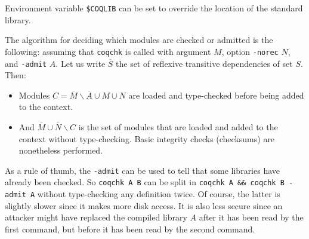 Environment variable \verb:$COQLIB: can be set to override the
location of the standard library.

The algorithm for deciding which modules are checked or admitted is
the following: assuming that {\tt coqchk} is called with argument $M$,
option {\tt -norec} $N$, and {\tt -admit} $A$. Let us write
$\overline{S}$ the set of reflexive transitive dependencies of set
$S$. Then:
\begin{itemize}
\item Modules $C=\overline{M}\backslash\overline{A}\cup M\cup N$ are
  loaded and type-checked before being added to the context.
\item And $\overline{M}\cup\overline{N}\backslash C$ is the set of
  modules that are loaded and added to the context without
  type-checking. Basic integrity checks (checksums) are nonetheless
  performed.
\end{itemize}

As a rule of thumb, the {\tt -admit} can be used to tell that some
libraries have already been checked. So {\tt coqchk A B} can be split
in {\tt coqchk A \&\& coqchk B -admit A} without type-checking any
definition twice. Of course, the latter is slightly slower since it
makes more disk access. It is also less secure since an attacker might
have replaced the compiled library $A$ after it has been read by the
first command, but before it has been read by the second command.


